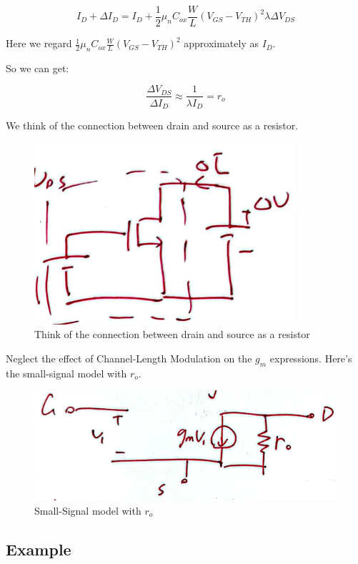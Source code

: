 \documentclass[fontset=windows]{article}
\begin{document}
$$I_D+\Delta I_D=I_D+\frac{1}{2} \mu_n C_{ox}\frac{W}{L}(V_{GS}-V_{TH})^2\lambda \Delta V_{DS}$$

Here we  regard $\frac{1}{2} \mu_n C_{ox}\frac{W}{L}(V_{GS}-V_{TH})^2$ approximately as $I_D$. 

So we can get: 

$$\frac{\Delta V_{DS}}{\Delta I_D}\approx \frac{1}{\lambda I_D}=r_o$$

We think of the connection between drain and source as a resistor. 

\begin{figure}[htbp]
    \centering
    \includegraphics[scale=0.6]{5.jpg}
    \captionsetup{labelformat=empty}
    \caption{Think of the connection between drain and source as a resistor}
    \label{5}
\end{figure}

Neglect the effect of Channel-Length Modulation on the $g_m$ expressions. 
Here's the small-signal model with $r_o$. 

\begin{figure}[htbp]
    \centering
    \includegraphics[scale=0.6]{6.jpg}
    \captionsetup{labelformat=empty}
    \caption{Small-Signal model with $r_o$}
    \label{6}
\end{figure}

\subsection*{Example}
\end{document}
